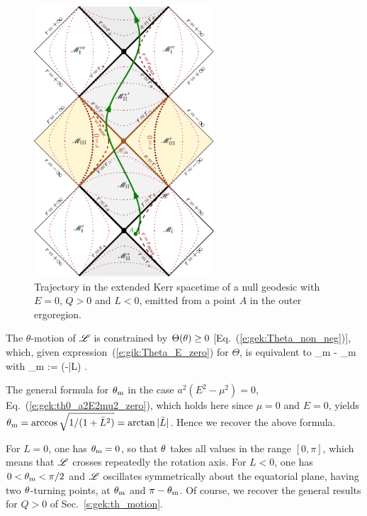 \begin{figure}
\centerline{\includegraphics[width=0.6\textwidth]{gik_zero_ener_traj.pdf}}
\caption[]{\label{f:gik:zero_ener_traj} \footnotesize
Trajectory in the extended Kerr spacetime of a null geodesic
with $E=0$, $Q>0$ and $L<0$, emitted from a point $A$ in the outer ergoregion.
}
\end{figure}

The $\theta$-motion of $\mathscr{L}$ is constrained by $\Theta(\theta) \geq 0$ [Eq.~(\ref{e:gek:Theta_non_neg})],
which, given expression~(\ref{e:gik:Theta_E_zero}) for $\Theta$, is
equivalent to
\be
    \th_{\rm m} \leq \th \leq \pi - \th_{\rm m} \quad\mbox{with}\quad
    \th_{\rm m} := \arctan (-\bar{L}) .
\ee
\begin{remark}
The general formula for $\theta_{\rm m}$ in the case
$a^2(E^2 - \mu^2) = 0$, Eq.~(\ref{e:gek:th0_a2E2mu2_zero}), which holds here since $\mu=0$ and $E=0$,
yields $\theta_{\rm m} = \arccos\sqrt{1/(1+ \bar{L}^2)} = \arctan | \bar{L} |$.
Hence we recover the above formula.
\end{remark}
For $L = 0$, one has $\theta_{\rm m} = 0$, so that $\theta$ takes all values in the
range $[0,\pi]$, which means that $\mathscr{L}$
crosses repeatedly the rotation axis. For $L< 0$, one has $0 < \theta_{\rm m} < \pi/2$ and
$\mathscr{L}$ oscillates symmetrically about the equatorial plane,
having two $\theta$-turning points, at $\theta_{\rm m} $ and $\pi-\theta_{\rm m}$. Of course, we
recover the general results for $Q>0$ of Sec.~\ref{s:gek:th_motion}.

